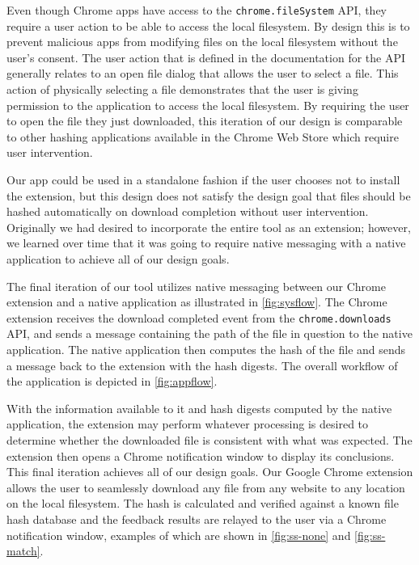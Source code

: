 \documentclass[letterpaper,twocolumn,10pt]{article}
\begin{document}
Even though Chrome apps have access to the \texttt{chrome.fileSystem} API, they require a user
action to be able to access the local filesystem. By design this is to prevent malicious apps from
modifying files on the local filesystem without the user’s consent. The user action that is defined
in the documentation for the API generally relates to an open file dialog that allows the user to select
a file. This action of physically selecting a file demonstrates that the user is giving permission to the
application to access the local filesystem. By requiring the user to open the file they just downloaded,
this iteration of our design is comparable to other hashing applications available in the Chrome
Web Store which require user intervention. 

Our app could be used in a standalone fashion if
the user chooses not to install the extension, but this design does not satisfy the design goal
that files should be hashed automatically on download completion without user intervention.
Originally we had desired to incorporate the entire tool as an extension; however, we learned
over time that it was going to require native messaging with a native application to achieve all
of our design goals.


The final iteration of our tool utilizes native messaging between our Chrome extension and a
native application as illustrated in \autoref{fig:sysflow}. The Chrome extension receives the download completed event from the
\texttt{chrome.downloads} API, and sends a message containing the path of the file in question
to the native application. The native application then computes the hash of the file and
sends a message back to the extension with the hash digests. The overall workflow of the application is depicted in \autoref{fig:appflow}.

With the information available to it and hash digests computed by the native application,
the extension may perform whatever processing is desired to determine whether the
downloaded file is consistent with what was expected.
The extension then opens a Chrome notification window to display its conclusions.
This final iteration achieves all of our design goals. Our Google Chrome extension allows
the user to seamlessly download any file from any website to any location on the local
filesystem. The hash is calculated and verified against a known file hash database and
the feedback results are relayed to the user via a Chrome notification window, examples
of which are shown in \autoref{fig:ss-none} and \autoref{fig:ss-match}.
\end{document}
